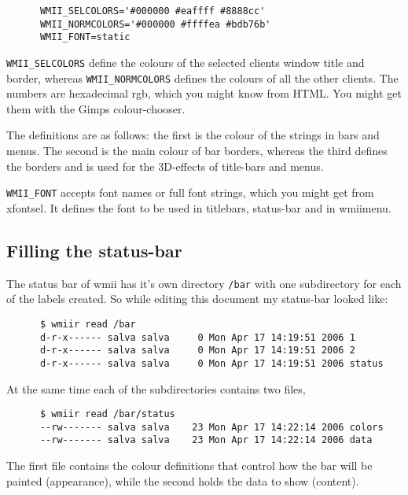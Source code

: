 \documentclass[12pt,a4paper]{article} %
\begin{document}
    \begin{verbatim}
      WMII_SELCOLORS='#000000 #eaffff #8888cc'
      WMII_NORMCOLORS='#000000 #ffffea #bdb76b'
      WMII_FONT=static
    \end{verbatim}

    \verb+WMII_SELCOLORS+ define the colours of the selected clients
    window title and border, whereas \verb+WMII_NORMCOLORS+ defines
    the colours of all the other clients. The numbers are hexadecimal
    rgb, which you might know from HTML. You might get them with the
    Gimps colour-chooser.

    The definitions are as follows: the first is the colour of the
    strings in bars and menus. The second is the main colour of bar
    borders, whereas the third defines the borders and is used for the
    3D-effects of title-bars and menus.

    \verb+WMII_FONT+ accepts font names or full font strings, which
    you might get from xfontsel. It defines the font to be used in
    titlebars, status-bar and in wmiimenu.

  \subsection{Filling the status-bar}
    \label{subsec:status}
    
    The status bar of wmii has it's own directory \verb+/bar+ with
    one subdirectory for each of the labels created. So while editing
    this document my status-bar looked like:

    \begin{verbatim}
      $ wmiir read /bar
      d-r-x------ salva salva     0 Mon Apr 17 14:19:51 2006 1
      d-r-x------ salva salva     0 Mon Apr 17 14:19:51 2006 2
      d-r-x------ salva salva     0 Mon Apr 17 14:19:51 2006 status
    \end{verbatim}
  
    At the same time each of the subdirectories contains two files,

    \begin{verbatim}
      $ wmiir read /bar/status
      --rw------- salva salva    23 Mon Apr 17 14:22:14 2006 colors
      --rw------- salva salva    23 Mon Apr 17 14:22:14 2006 data
    \end{verbatim}


    The first file contains the colour definitions that control how the
    bar will be painted (appearance), while the second holds the data
    to show (content).
    
\end{document}
